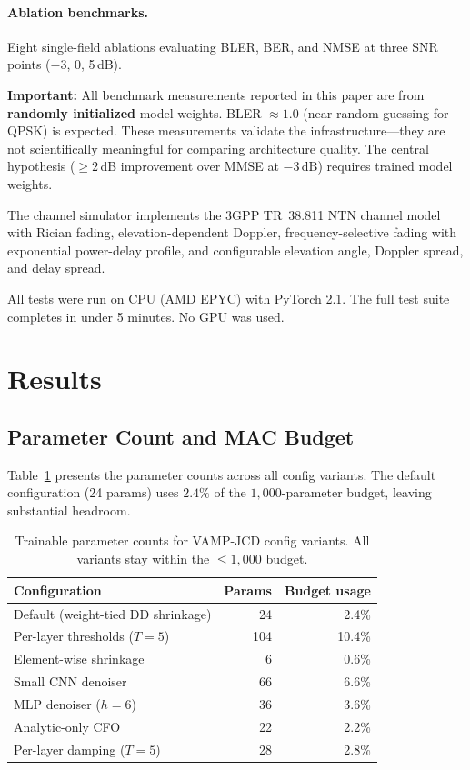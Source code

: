 \documentclass{article}
\begin{document}
\paragraph{Ablation benchmarks.} Eight single-field ablations evaluating BLER, BER, and NMSE at three SNR points ($-3$, 0, 5\,dB).

\noindent\textbf{Important:} All benchmark measurements reported in this paper are from \textbf{randomly initialized} model weights. BLER $\approx 1.0$ (near random guessing for QPSK) is expected. These measurements validate the infrastructure---they are not scientifically meaningful for comparing architecture quality. The central hypothesis ($\geq 2$\,dB improvement over MMSE at $-3$\,dB) requires trained model weights.

The channel simulator implements the 3GPP TR~38.811 NTN channel model~\cite{3gppTR38811} with Rician fading, elevation-dependent Doppler, frequency-selective fading with exponential power-delay profile, and configurable elevation angle, Doppler spread, and delay spread.

All tests were run on CPU (AMD EPYC) with PyTorch 2.1. The full test suite completes in under 5 minutes. No GPU was used.

\section{Results}
\label{sec:results}

\subsection{Parameter Count and MAC Budget}

Table~\ref{tab:params} presents the parameter counts across all config variants. The default configuration (24 params) uses $2.4\%$ of the $1{,}000$-parameter budget, leaving substantial headroom.

\begin{table}[h]
  \centering
  \caption{Trainable parameter counts for VAMP-JCD config variants. All variants stay within the $\leq 1{,}000$ budget.}
  \label{tab:params}
  \begin{tabular}{@{}lrr@{}}
    \toprule
    Configuration & Params & Budget usage \\
    \midrule
    Default (weight-tied DD shrinkage) & 24 & 2.4\% \\
    Per-layer thresholds ($T=5$) & 104 & 10.4\% \\
    Element-wise shrinkage & 6 & 0.6\% \\
    Small CNN denoiser & 66 & 6.6\% \\
    MLP denoiser ($h=6$) & 36 & 3.6\% \\
    Analytic-only CFO & 22 & 2.2\% \\
    Per-layer damping ($T=5$) & 28 & 2.8\% \\
    \bottomrule
  \end{tabular}
\end{table}
\end{document}
